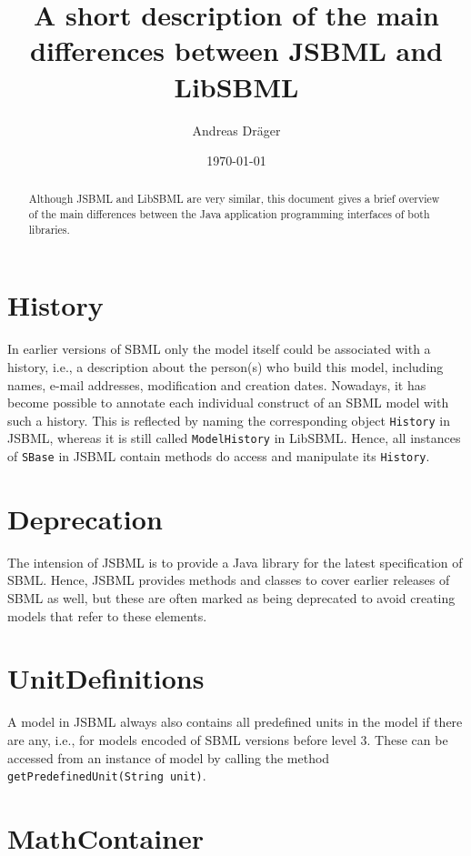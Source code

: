 \documentclass[a4paper,11pt]{scrartcl}
\title{A short description of the main differences between JSBML and LibSBML}
\author{Andreas Dr\"ager}
\date{\today}
\begin{document}
\maketitle

\begin{abstract}
Although JSBML and LibSBML are very similar, this document gives a brief
overview of the main differences between the Java\texttrademark{} application
programming interfaces of both libraries.
\end{abstract}

\section{History}

In earlier versions of SBML only the model itself could be associated with a
history, i.e., a description about the person(s) who build this model, including
names, e-mail addresses, modification and creation dates. Nowadays, it has
become possible to annotate each individual construct of an SBML model with such
a history. This is reflected by naming the corresponding object \verb!History!
in JSBML, whereas it is still called \verb!ModelHistory! in LibSBML. Hence, all
instances of \verb!SBase! in JSBML contain methods do access and manipulate its
\verb!History!.

\section{Deprecation}

The intension of JSBML is to provide a Java library for the latest 
specification of SBML. Hence, JSBML provides methods and classes to
cover earlier releases of SBML as well, but these are often marked
as being deprecated to avoid creating models that refer to these 
elements.

\section{UnitDefinitions}

A model in JSBML always also contains all predefined units in the model
if there are any, i.e., for models encoded of SBML versions before level
3. These can be accessed from an instance of model by calling the method
\verb!getPredefinedUnit(String unit)!.

\section{MathContainer}
\end{document}
